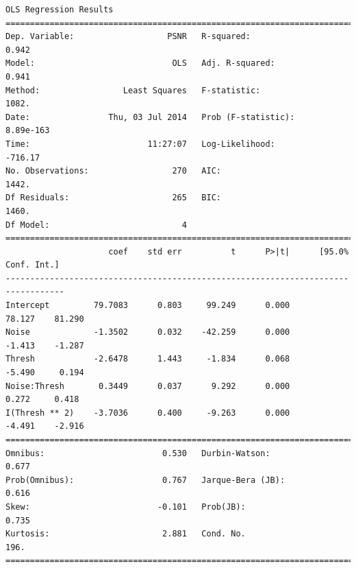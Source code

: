 \documentclass[11pt]{article}
\theoremstyle{definition}
\begin{document}
{\footnotesize
\begin{lstlisting}[caption = Time Series 1 - Wavelet Coefficient Thresholding OLS Model, label = {waveletfilterseries1}]
                            OLS Regression Results                            
==============================================================================
Dep. Variable:                   PSNR   R-squared:                       0.942
Model:                            OLS   Adj. R-squared:                  0.941
Method:                 Least Squares   F-statistic:                     1082.
Date:                Thu, 03 Jul 2014   Prob (F-statistic):          8.89e-163
Time:                        11:27:07   Log-Likelihood:                -716.17
No. Observations:                 270   AIC:                             1442.
Df Residuals:                     265   BIC:                             1460.
Df Model:                           4                                         
==================================================================================
                     coef    std err          t      P>|t|      [95.0% Conf. Int.]
----------------------------------------------------------------------------------
Intercept         79.7083      0.803     99.249      0.000        78.127    81.290
Noise             -1.3502      0.032    -42.259      0.000        -1.413    -1.287
Thresh            -2.6478      1.443     -1.834      0.068        -5.490     0.194
Noise:Thresh       0.3449      0.037      9.292      0.000         0.272     0.418
I(Thresh ** 2)    -3.7036      0.400     -9.263      0.000        -4.491    -2.916
==============================================================================
Omnibus:                        0.530   Durbin-Watson:                   0.677
Prob(Omnibus):                  0.767   Jarque-Bera (JB):                0.616
Skew:                          -0.101   Prob(JB):                        0.735
Kurtosis:                       2.881   Cond. No.                         196.
==============================================================================
\end{lstlisting}

}
\end{document}
